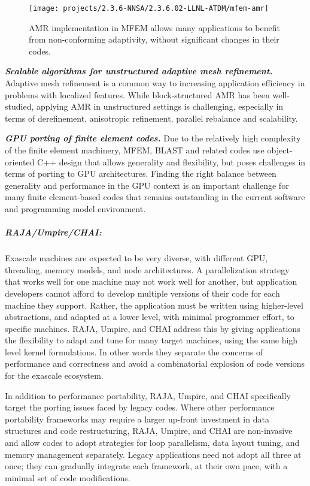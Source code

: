 \begin{figure}[htb]
\centering
\texttt{[image: projects/2.3.6-NNSA/2.3.6.02-LLNL-ATDM/mfem-amr]}
\caption{\label{fig:mfem-amr}AMR implementation in MFEM allows many applications to benefit
from non-conforming adaptivity, without significant changes in their codes.}
\end{figure}

\noindent
{\bf \em Scalable algorithms for unstructured adaptive mesh refinement.}
Adaptive mesh refinement is a common way to increasing application efficiency
in problems with localized features. While block-structured AMR has been
well-studied, applying AMR in unstructured settings is challenging, especially
in terms of derefinement, anisotropic refinement, parallel rebalance and
scalability.

\noindent
{\bf \em GPU porting of finite element codes.}
Due to the relatively high complexity of the finite element machinery, MFEM,
BLAST and related codes use object-oriented C++ design that allows generality
and flexibility, but poses challenges in terms of porting to GPU architectures.
Finding the right balance between generality and performance in the GPU context
is an important challenge for many finite element-based codes that remains
outstanding in the current software and programming model environment.

\subparagraph{RAJA/Umpire/CHAI:}
Exascale machines are expected to be very diverse, with different GPU,
threading, memory models, and node architectures.  A parallelization
strategy that works well for one machine may not work well for another,
but application developers cannot afford to develop multiple versions of
their code for each machine they support.  Rather, the application must
be written using higher-level abstractions, and adapted at a lower level,
with minimal programmer effort, to specific machines.  RAJA, Umpire, and
CHAI address this by giving applications the flexibility to adapt and
tune for many target machines, using the same high level kernel
formulations.  In other words they separate the concerns of performance
and correctness and avoid a combinatorial explosion of code versions for
the exascale ecosystem.

In addition to performance portability, RAJA, Umpire, and CHAI
specifically target the porting issues faced by legacy codes.  Where
other performance portability frameworks may require a larger up-front
investment in data structures and code restructuring, RAJA, Umpire, and
CHAI are non-invasive and allow codes to adopt strategies for loop
parallelism, data layout tuning, and memory management separately.
Legacy applications need not adopt all three at once; they can gradually
integrate each framework, at their own pace, with a minimal set of code
modifications.

